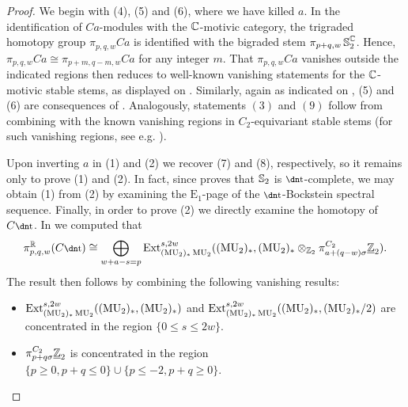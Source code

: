 \begin{proof}
	We begin with (4), (5) and (6), where we have killed $a$.  In the identification of $Ca$-modules with the $\mathbb{C}$-motivic category, the trigraded homotopy group $\pi_{p,q,w} Ca$ is identified with the bigraded stem $\pi_{p+q,w}\operatorname{\mathbb{S}}_2^{\mathbb{C}}$. Hence, $\pi_{p,q,w} Ca \cong \pi_{p+m,q-m,w} Ca$ for any integer $m$.  That $\pi_{p,q,w} Ca$ vanishes outside the indicated regions then reduces to well-known vanishing statements for the $\mathbb{C}$-motivic stable stems, as displayed on \cite[p.2]{GI}.  Similarly, again as indicated on \cite[p.2]{GI}, (5) and (6) are consequences of \cite[Theorem 6.7]{LevineComparison}.  Analogously, statements $(3)$ and $(9)$ follow from combining  with the known vanishing regions in $C_2$-equivariant stable stems (for such vanishing regions, see e.g. \cite[Figure 5]{c2stems}).
	
	Upon inverting $a$ in (1) and (2) we recover (7) and (8), respectively, so it remains only to prove (1) and (2).  In fact, since  proves that $\operatorname{\mathbb{S}}_2$ is $\ta$-complete, we may obtain (1) from (2) by examining the $\mathrm{E}_1$-page of the $\ta$-Bockstein spectral sequence. Finally, in order to prove (2) we directly examine the homotopy of $C\ta$.
	  In  we computed that  
  \[ \pi_{p,q,w}^\R(C\ta) \cong \bigoplus_{w+a-s = p} \Ext_{(\MU_2)_* \MU_2 }^{s,2w}((\MU_2)_*, (\MU_2)_* \otimes_{\Z_2} \pi_{a + (q-w) \sigma}^{C_2} \uZt). \]
  The result then follows by combining the following vanishing results:
  \begin{itemize}
    \item $\operatorname{\mathrm{Ext}}_{(\operatorname{\mathrm{MU}}_2)_* \operatorname{\mathrm{MU}}_2 }^{s,2w} ((\operatorname{\mathrm{MU}}_2)_*, (\operatorname{\mathrm{MU}}_2)_*)$ and $\operatorname{\mathrm{Ext}}_{(\operatorname{\mathrm{MU}}_2)_* \operatorname{\mathrm{MU}}_2 }^{s,2w} ((\operatorname{\mathrm{MU}}_2)_*, (\operatorname{\mathrm{MU}}_2)_*/2)$ are concentrated in the region $\{ 0 \leq s \leq 2w \}$.
  \item $\pi_{p + q\sigma} ^{C_2} \underline{\mathbb{Z}}_{2}$ is concentrated in the region $\{ p \geq 0, p+q \leq 0\} \cup \{ p \leq -2, p+q \geq 0 \}$.
  \end{itemize}
	
	


\end{proof}
